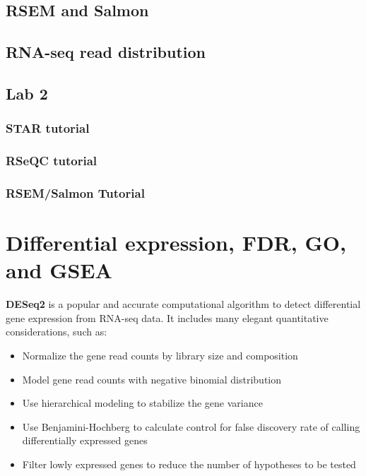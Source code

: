 \documentclass[
]{book}
\providecommand{\tightlist}{%
  \setlength{\itemsep}{0pt}\setlength{\parskip}{0pt}}
\begin{document}
\hypertarget{rsem-and-salmon}{%
\section{RSEM and Salmon}\label{rsem-and-salmon}}

\hypertarget{rna-seq-read-distribution}{%
\section{RNA-seq read distribution}\label{rna-seq-read-distribution}}

\hypertarget{lab-2}{%
\section{Lab 2}\label{lab-2}}

\hypertarget{star-tutorial}{%
\subsection{STAR tutorial}\label{star-tutorial}}

\hypertarget{rseqc-tutorial}{%
\subsection{RSeQC tutorial}\label{rseqc-tutorial}}

\hypertarget{rsemsalmon-tutorial}{%
\subsection{RSEM/Salmon Tutorial}\label{rsemsalmon-tutorial}}

\hypertarget{de}{%
\chapter{Differential expression, FDR, GO, and GSEA}\label{de}}

\textbf{DESeq2} is a popular and accurate computational algorithm to detect differential gene expression from RNA-seq data. It includes many elegant quantitative considerations, such as:

\begin{itemize}
\tightlist
\item
  Normalize the gene read counts by library size and composition\\
\item
  Model gene read counts with negative binomial distribution\\
\item
  Use hierarchical modeling to stabilize the gene variance\\
\item
  Use Benjamini-Hochberg to calculate control for false discovery rate of calling differentially expressed genes\\
\item
  Filter lowly expressed genes to reduce the number of hypotheses to be tested
\end{itemize}
\end{document}
